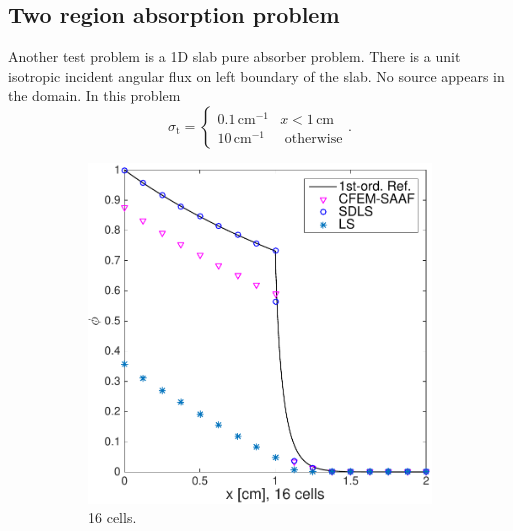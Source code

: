 \documentclass[review]{elsarticle}
\newcommand{\st}{\sigma_\mathrm{t}}
\begin{document}
\subsection{Two region absorption problem}
Another test problem is a 1D slab pure absorber problem. There is a unit {isotropic} incident angular flux on left boundary of the slab. No source appears in the domain. In this problem \[\st= \begin{cases} 0.1\,  \text{cm}^{-1} &  x<1\, \text{cm} \\  10\, \text{cm}^{-1} & \text{ otherwise}\end{cases}.\]
\begin{figure}[ht!]
	\begin{subfigure}{.5\textwidth}
		\centering
		\hspace*{-1cm}\includegraphics[width=1.\linewidth]{2reg-16c-cdls.pdf}
		\caption{16 cells.}
		\label{f:2reg-16c}
	\end{subfigure}
	~
	\begin{subfigure}{.5\textwidth}
		\centering

\end{subfigure}
\end{figure}
\end{document}
